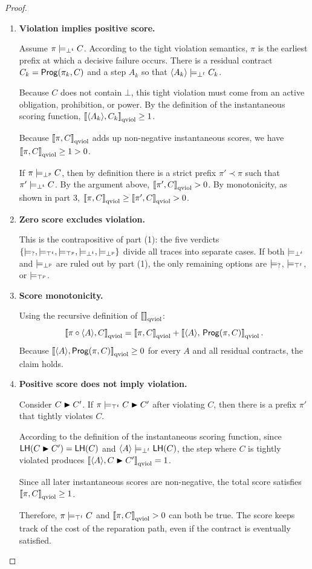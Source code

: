   \begin{proof}

  \begin{enumerate}

  \item \textbf{Violation implies positive score.}

Assume $\pi \models_{\bot^t} C$.
According to the tight violation semantics, $\pi$ is the earliest prefix at which a decisive failure occurs.
There is a residual contract $C_k = \mathsf{Prog}(\pi_k, C)$ and a step $A_k$ so that $\langle A_k \rangle  \models_{\bot^t} C_k$.

Because $C$ does not contain $\bot$, this tight violation must come from an active obligation, prohibition, or power.
By the definition of the instantaneous scoring function, $\left\llbracket \langle A_k \rangle , C_k \right\rrbracket_{\text{qviol}} \ge 1$.

Because $\left\llbracket \pi, C \right\rrbracket_{\text{qviol}}$ adds up non-negative instantaneous scores, we have $\left\llbracket \pi, C \right\rrbracket_{\text{qviol}} \ge 1 > 0$.

If $\pi \models_{\bot^p} C$, then by definition there is a strict prefix $\pi' \prec \pi$ such that $\pi' \models_{\bot^t} C$.
By the argument above, $\left\llbracket \pi', C \right\rrbracket_{\text{qviol}} > 0$.
By monotonicity, as shown in part 3, $\left\llbracket \pi, C \right\rrbracket_{\text{qviol}} \ge \left\llbracket \pi', C \right\rrbracket_{\text{qviol}} > 0$.

  \item \textbf{Zero score excludes violation.}

This is the contrapositive of part (1): the five verdicts $\{\models_{?}, \models_{\top^t}, \models_{\top^p}, \models_{\bot^t}, \models_{\bot^p}\}$ divide all traces into separate cases.
If both $\models_{\bot^t}$ and $\models_{\bot^p}$ are ruled out by part (1), the only remaining options are $\models_{?}$, $\models_{\top^t}$, or $\models_{\top^p}$.

  \item \textbf{Score monotonicity.}

Using the recursive definition of $\left\llbracket  \right\rrbracket_{\text{qviol}}$:
  \[
    \left\llbracket \pi \circ \langle A \rangle , C \right\rrbracket_{\text{qviol}}
    = \left\llbracket \pi, C \right\rrbracket_{\text{qviol}} + \left\llbracket \langle A \rangle ,\, \mathsf{Prog}(\pi, C) \right\rrbracket_{\text{qviol}}.
  \]
Because $\left\llbracket \langle A \rangle , \mathsf{Prog}(\pi, C) \right\rrbracket_{\text{qviol}} \ge 0$ for every $A$ and all residual contracts, the claim holds.

  \item \textbf{Positive score does not imply violation.}

  Consider $C \blacktriangleright C'$.
If $\pi \models_{\top^t} C \blacktriangleright C'$ after violating $C$, then there is a prefix $\pi'$ that tightly violates $C$.

According to the definition of the instantaneous scoring function, since $\mathsf{LH}(C \blacktriangleright C') = \mathsf{LH}(C)$ and $\langle A \rangle  \models_{\bot^t} \mathsf{LH}(C)$, the step where $C$ is tightly violated produces $\left\llbracket \langle A \rangle , C \blacktriangleright C' \right\rrbracket_{\text{qviol}} = 1$.

Since all later instantaneous scores are non-negative, the total score satisfies $\left\llbracket \pi, C \right\rrbracket_{\text{qviol}} \ge 1$.

Therefore, $\pi \models_{\top^t} C$ and $\left\llbracket \pi, C \right\rrbracket_{\text{qviol}} > 0$ can both be true. The score keeps track of the cost of the reparation path, even if the contract is eventually satisfied.

\end{enumerate}

  \end{proof}


